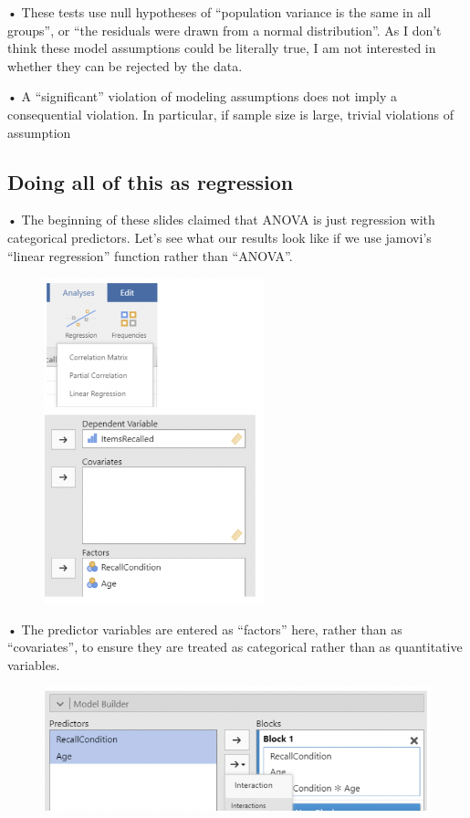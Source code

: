 \documentclass[
  letterpaper,
  DIV=11,
  numbers=noendperiod]{scrreprt}
\begin{document}
• These tests use null hypotheses of ``population variance is the same
in all groups'', or ``the residuals were drawn from a normal
distribution''. As I don't think these model assumptions could be
literally true, I am not interested in whether they can be rejected by
the data.

• A ``significant'' violation of modeling assumptions does not imply a
consequential violation. In particular, if sample size is large, trivial
violations of assumption

\hypertarget{doing-all-of-this-as-regression}{%
\subsection{Doing all of this as
regression}\label{doing-all-of-this-as-regression}}

• The beginning of these slides claimed that ANOVA is just regression
with categorical predictors. Let's see what our results look like if we
use jamovi's ``linear regression'' function rather than ``ANOVA''.

\begin{figure}

{\centering \includegraphics[width=2.52083in,height=\textheight]{images/Mod5_11.png}

}

\end{figure}

• The predictor variables are entered as ``factors'' here, rather than
as ``covariates'', to ensure they are treated as categorical rather than
as quantitative variables.

\begin{figure}

{\centering \includegraphics[width=5in,height=\textheight]{images/Mod5_12.png}

}

\end{figure}
\end{document}
